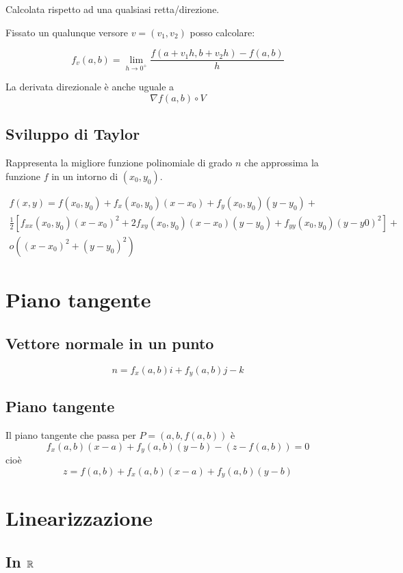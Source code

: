 Calcolata rispetto ad una qualsiasi retta/direzione.

Fissato un qualunque versore $v=(v_1,v_2)$ posso calcolare:

$$
f_v(a,b) = \lim_{h\to 0^+} \frac{f(a+v_1h,b+v_2h)-f(a,b)}{h}
$$

La derivata direzionale è anche uguale a $$\nabla f(a,b)\circ V$$

\subsection{Sviluppo di Taylor}

Rappresenta la migliore funzione polinomiale di grado $n$ che approssima la funzione $f$ in un intorno di $(x_0, y_0)$.

\begin{multline*}
f(x,y) = f(x_0,y_0)+f_x(x_0,y_0)(x-x_0)+f_y(x_0,y_0)(y-y_0)+ \\ \frac{1}{2} [f_{xx}(x_0,y_0)(x-x_0)^2+2f_{xy}(x_0,y_0)(x-x_0)(y-y_0)+f_{yy}(x_0,y_0)(y-y0)^2]+ \\ o((x-x_0)^2+(y-y_0)^2)
\end{multline*}

\section{Piano tangente}

\subsection{Vettore normale in un punto}

$$n = f_x(a,b)i+f_y(a,b)j-k$$

\subsection{Piano tangente}

Il piano tangente che passa per $P = (a,b,f(a,b))$ è $$f_x(a,b)(x-a)+f_y(a,b)(y-b)-(z-f(a,b))=0$$ cioè
$$z = f(a,b) + f_x(a,b)(x-a) + f_y(a,b)(y-b)$$

\section{Linearizzazione}

\subsection{In $\mathbb{R}$}

